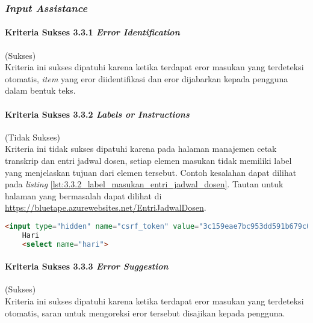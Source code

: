 \subsubsection{\textit{Input Assistance}}
\label{subsubsec:kepatuhan_bluetape_input_assistance}

\paragraph{Kriteria Sukses 3.3.1 \textit{Error Identification}}
\label{par:kepatuhan_bluetape_kriteria_sukses_3.3.1}
(Sukses)\\

Kriteria ini sukses dipatuhi karena ketika terdapat eror masukan yang terdeteksi otomatis, \textit{item} yang eror diidentifikasi dan eror dijabarkan kepada pengguna dalam bentuk teks.

\paragraph{Kriteria Sukses 3.3.2 \textit{Labels or Instructions}}
\label{par:kepatuhan_bluetape_kriteria_sukses_3.3.2}
(Tidak Sukses)\\

Kriteria ini tidak sukses dipatuhi karena pada halaman manajemen cetak transkrip dan entri jadwal dosen, setiap elemen masukan tidak memiliki label yang menjelaskan tujuan dari elemen tersebut. Contoh kesalahan dapat dilihat pada \textit{listing} \ref{lst:3.3.2_label_masukan_entri_jadwal_dosen}. Tautan untuk halaman yang bermasalah dapat dilihat di \url{https://bluetape.azurewebsites.net/EntriJadwalDosen}.

\begin{lstlisting}[frame=single, label={lst:3.3.2_label_masukan_entri_jadwal_dosen}, language=HTML, caption=Kriteria Sukses 3.3.2 - Tidak Terdapat Label pada Kolom Masukan di Halaman Entri Jadwal Dosen]
    <input type="hidden" name="csrf_token" value="3c159eae7bc953dd591b679c080ed066"/>
    Hari
    <select name="hari">
\end{lstlisting}

\paragraph{Kriteria Sukses 3.3.3 \textit{Error Suggestion}}
\label{par:kepatuhan_bluetape_kriteria_sukses_3.3.3}
(Sukses)\\

Kriteria ini sukses dipatuhi karena ketika terdapat eror masukan yang terdeteksi otomatis, saran untuk mengoreksi eror tersebut disajikan kepada pengguna.

